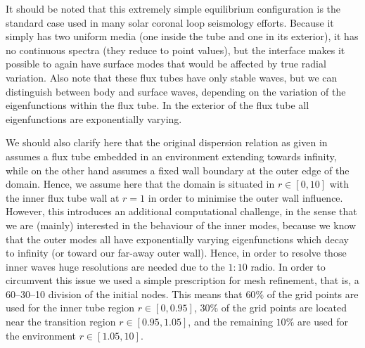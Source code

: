 It should be noted that this extremely simple equilibrium configuration is the standard case used in many solar coronal loop seismology efforts. Because it simply has two uniform media (one inside the tube and one in its exterior), it has no continuous spectra (they reduce to point values), but the interface makes it possible to again have surface modes that would be affected by true radial variation. Also note that these flux tubes have only stable waves, but we can distinguish between body and surface waves, depending on the variation of the eigenfunctions within the flux tube. In the exterior of the flux tube all eigenfunctions are exponentially varying.

We should also clarify here that the original dispersion relation as given in \citet{book_roberts} assumes a flux tube embedded in an environment extending towards infinity, while {\legolas} on the other hand assumes a fixed wall boundary at the outer edge of the domain. Hence, we assume here that the domain is situated in $r \in [0, 10]$ with the inner flux tube wall at $r = 1$ in order to minimise the outer wall influence. However, this introduces an additional computational challenge, in the sense that we are (mainly) interested in the behaviour of the inner modes, because we know that the outer modes all have exponentially varying eigenfunctions which decay to infinity (or toward our far-away outer wall). Hence, in order to resolve those inner waves huge resolutions are needed due to the $1:10$ radio. In order to circumvent this issue we used a simple prescription for mesh refinement, that is, a 60--30--10 division of the initial nodes. This means that $60\%$ of the grid points are used for the inner tube region $r \in [0, 0.95]$, $30\%$ of the grid points are located near the transition region $r \in [0.95, 1.05]$, and the remaining $10\%$ are used for the environment $r \in [1.05, 10]$.

